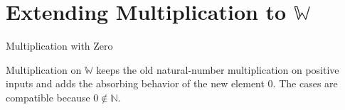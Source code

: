 
\section{Extending Multiplication to \texorpdfstring{$\mathbb{W}$}{W}}
\label{sec:extending-multiplication-to-w}
\begin{topicbox}{Multiplication with Zero}
\begin{exposition}
Multiplication on $\mathbb{W}$ keeps the old natural-number multiplication
on positive inputs and adds the absorbing behavior of the new element $0$.
The cases are compatible because $0\notin\mathbb{N}$.
\end{exposition}
\end{topicbox}
